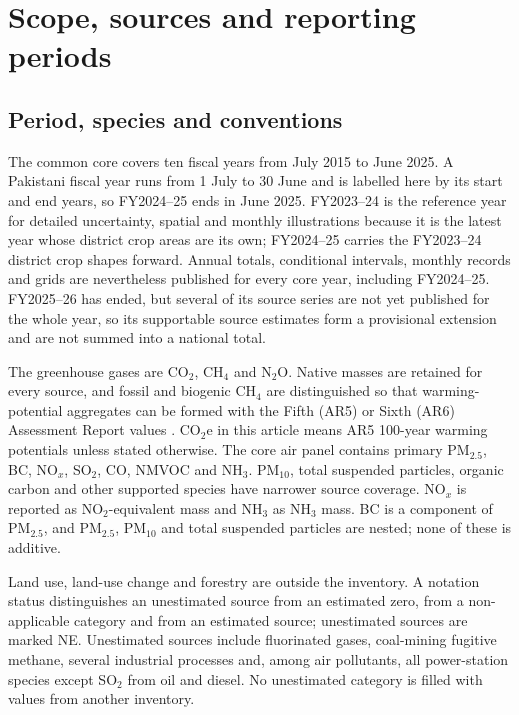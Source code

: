 \documentclass[essd,manuscript]{copernicus}
\begin{document}
\section{Scope, sources and reporting periods}
\label{sec:scope}
\subsection{Period, species and conventions}
The common core covers ten fiscal years from July 2015 to June 2025. A Pakistani fiscal year runs from 1 July to 30 June and is labelled here by its start and end years, so FY2024--25 ends in June 2025. FY2023--24 is the reference year for detailed uncertainty, spatial and monthly illustrations because it is the latest year whose district crop areas are its own; FY2024--25 carries the FY2023--24 district crop shapes forward. Annual totals, conditional intervals, monthly records and grids are nevertheless published for every core year, including FY2024--25. FY2025--26 has ended, but several of its source series are not yet published for the whole year, so its supportable source estimates form a provisional extension and are not summed into a national total.

The greenhouse gases are CO$_2$, CH$_4$ and N$_2$O. Native masses are retained for every source, and fossil and biogenic CH$_4$ are distinguished so that warming-potential aggregates can be formed with the Fifth (AR5) or Sixth (AR6) Assessment Report values \citep{IPCCAR5,IPCCAR6}. CO$_2$e in this article means AR5 100-year warming potentials unless stated otherwise. The core air panel contains primary PM$_{2.5}$, BC, NO$_x$, SO$_2$, CO, NMVOC and NH$_3$. PM$_{10}$, total suspended particles, organic carbon and other supported species have narrower source coverage. NO$_x$ is reported as NO$_2$-equivalent mass and NH$_3$ as NH$_3$ mass. BC is a component of PM$_{2.5}$, and PM$_{2.5}$, PM$_{10}$ and total suspended particles are nested; none of these is additive.

Land use, land-use change and forestry are outside the inventory. A notation status distinguishes an unestimated source from an estimated zero, from a non-applicable category and from an estimated source; unestimated sources are marked NE. Unestimated sources include fluorinated gases, coal-mining fugitive methane, several industrial processes and, among air pollutants, all power-station species except SO$_2$ from oil and diesel. No unestimated category is filled with values from another inventory.
\end{document}
